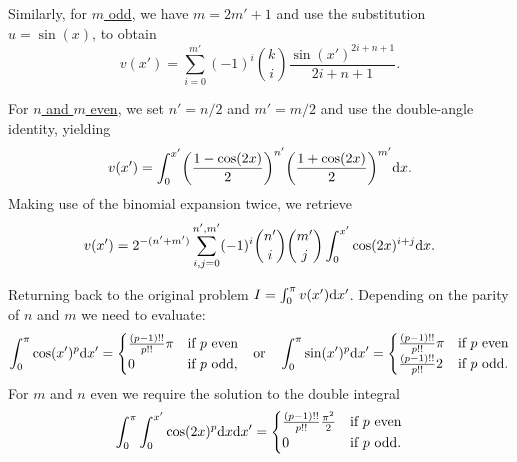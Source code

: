 Similarly, for \underline{$m$ odd}, we have $m=2m' + 1$ and use the substitution $u = \sin(x)$, to obtain
\begin{equation}
    v(x') = \sum_{i=0}^{m'} (-1)^{i} \binom{k}{i} \frac{\sin(x')^{2i+n+1}}{2i+n+1}.
\end{equation}

For \underline{$n$ and $m$ even}, we set $n' = n/2$ and $m' = m/2$ and use the double-angle identity, yielding
\begin{equation}
    v(x') = \int_0^{x'} \left(\frac{1 - \cos(2x)}{2}\right)^{n'} \left(\frac{1 + \cos(2x)}{2}\right)^{m'} \calcd{x}.
\end{equation}
Making use of the binomial expansion twice, we retrieve
\begin{equation}
    v(x') = 2^{-(n' + m')} \sum_{i,j=0}^{n', m'} (-1)^{i} \binom{n'}{i} \binom{m'}{j} 
    \int_0^{x'} \cos(2x)^{i+j} \mathrm{d}{x}.
\end{equation}

Returning back to the original problem $I = \int_0^\pi v(x') \mathrm{d}{x'}$. Depending on the parity of $n$ and $m$ we need to evaluate:
\begin{equation}
    \int_0^\pi \cos(x')^p \calcd{x'} = 
    \begin{cases}
        \frac{(p-1)!!}{p!!} \pi   & \text{if}\ p\ \text{even} \\
        0                         & \text{if}\ p\ \text{odd},
    \end{cases}
    \quad \text{or} \quad
    \int_0^\pi \sin(x')^p \calcd{x'} = 
    \begin{cases}
        \frac{(p-1)!!}{p!!} \pi   & \text{if}\ p\ \text{even} \\
        \frac{(p-1)!!}{p!!} 2   & \text{if}\ p\ \text{odd}.
    \end{cases}
\end{equation}
For $m$ and $n$ even we require the solution to the double integral
\begin{equation}
    \int_0^\pi \int_0^{x'} \cos(2x)^p \calcd{x} \calcd{x'} = 
    \begin{cases}
        \frac{(p-1)!!}{p!!} \frac{\pi^2}{2}   & \text{if}\ p\ \text{even} \\
        0   & \text{if}\ p\ \text{odd}.
    \end{cases}
\end{equation}

